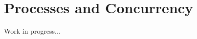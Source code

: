 \documentclass[a4paper,11pt]{book}
\theoremstyle{plain}
\theoremstyle{definition}
\begin{document}
\chapter{Processes and Concurrency}

Work in progress...
\end{document}
